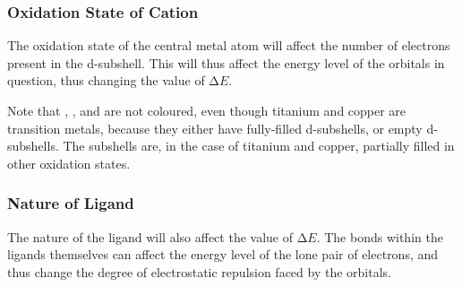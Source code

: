 			\subsubsection{Oxidation State of Cation}

				The oxidation state of the central metal atom will affect the number of electrons present in the d-subshell. This will thus
				affect the energy level of the orbitals in question, thus changing the value of $∆E$.

				Note that , ,  and  are not coloured, even though titanium and copper are transition metals,
				because they either have fully-filled d-subshells, or empty d-subshells. The subshells are, in the case of titanium and copper,
				partially filled in other oxidation states.



			\subsubsection{Nature of Ligand}

				The nature of the ligand will also affect the value of $∆E$. The bonds within the ligands themselves can affect the energy
				level of the lone pair of electrons, and thus change the degree of electrostatic repulsion faced by the orbitals.


















